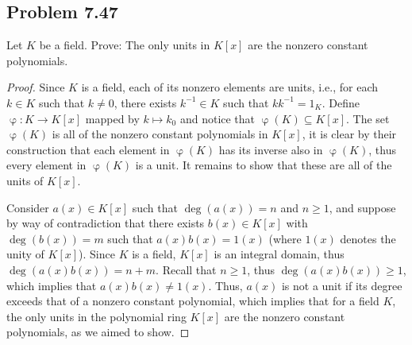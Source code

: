 \documentclass[letterpaper, 12pt]{amsart}
\DeclareMathOperator{\ph}{\varphi}
\begin{document}
		\subsection*{Problem 7.47}
		\label{sub:problem_7_47}
		Let $K$ be a field. Prove: 
		The only units in $K[x]$ are the nonzero constant polynomials.
		\begin{proof}
		Since $K$ is a field, each of its nonzero elements are units, i.e., for each $k \in K$ such that $k \neq 0$, there exists $k^{-1} \in K$ such that $kk^{-1} = 1_{K}$.
		Define $\ph : K \to K[x]$ mapped by $k \mapsto k_{0}$ and notice that $\ph(K) \subseteq K[x]$.
		The set $\ph(K)$ is all of the nonzero constant polynomials in $K[x]$, it is clear by their construction that each element in $\ph(K)$ has its inverse also in $\ph(K)$, thus every element in $\ph(K)$ is a unit.
		It remains to show that these are all of the units of $K[x]$.

		Consider $a(x) \in K[x]$ such that $\deg(a(x)) = n$ and $n \geq 1$, and suppose by way of contradiction that there exists $b(x) \in K[x]$ with $\deg(b(x)) = m$ such that $a(x)b(x) = 1(x)$ (where $1(x)$ denotes the unity of $K[x]$).
		Since $K$ is a field, $K[x]$ is an integral domain, thus $\deg(a(x)b(x)) = n + m$.
		Recall that $n \geq 1$, thus $\deg(a(x)b(x)) \geq 1$, which implies that $a(x)b(x) \neq 1(x)$.
		Thus, $a(x)$ is not a unit if its degree exceeds that of a nonzero constant polynomial, which implies that for a field $K$, the only units in the polynomial ring $K[x]$ are the nonzero constant polynomials, as we aimed to show.
		\end{proof}
\end{document}
